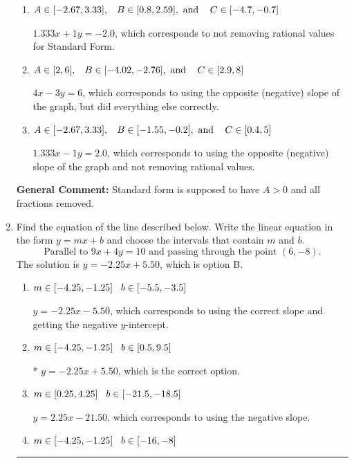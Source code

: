 \documentclass{extbook}[14pt]
\newcommand{\litem}[1]{\item #1

\rule{\textwidth}{0.4pt}}
\begin{document}
\begin{enumerate}
{\begin{enumerate}[label=\Alph*.]
 $-4x - 3y = 6$, which corresponds to not making $A$ positive (by multiplying the equation by $-1$).
\item \( A \in [-2.67, 3.33], \hspace{3mm} B \in [0.8, 2.59], \text{ and } \hspace{3mm} C \in [-4.7, -0.7] \)

 $1.333x + 1y = -2.0$, which corresponds to not removing rational values for Standard Form.
\item \( A \in [2, 6], \hspace{3mm} B \in [-4.02, -2.76], \text{ and } \hspace{3mm} C \in [2.9, 8] \)

 $4x - 3y = 6$, which corresponds to using the opposite (negative) slope of the graph, but did everything else correctly.
\item \( A \in [-2.67, 3.33], \hspace{3mm} B \in [-1.55, -0.2], \text{ and } \hspace{3mm} C \in [0.4, 5] \)

 $1.333x - 1y = 2.0$, which corresponds to using the opposite (negative) slope of the graph and not removing rational values.
\end{enumerate}

\textbf{General Comment:} Standard form is supposed to have $A > 0$ and all fractions removed.
}
\litem{
Find the equation of the line described below. Write the linear equation in the form $ y=mx+b $ and choose the intervals that contain $m$ and $b$.
\[ \text{Parallel to } 9 x + 4 y = 10 \text{ and passing through the point } (6, -8). \]The solution is \( y = -2.25x + 5.50 \), which is option B.\begin{enumerate}[label=\Alph*.]
\item \( m \in [-4.25, -1.25] \hspace*{3mm} b \in [-5.5, -3.5] \)

 $y = -2.25x - 5.50$, which corresponds to using the correct slope and getting the negative $y$-intercept.
\item \( m \in [-4.25, -1.25] \hspace*{3mm} b \in [0.5, 9.5] \)

* $y = -2.25x + 5.50$, which is the correct option.
\item \( m \in [0.25, 4.25] \hspace*{3mm} b \in [-21.5, -18.5] \)

 $y = 2.25x - 21.50$, which corresponds to using the negative slope.
\item \( m \in [-4.25, -1.25] \hspace*{3mm} b \in [-16, -8] \)


\end{enumerate}}
\end{enumerate}
\end{document}
